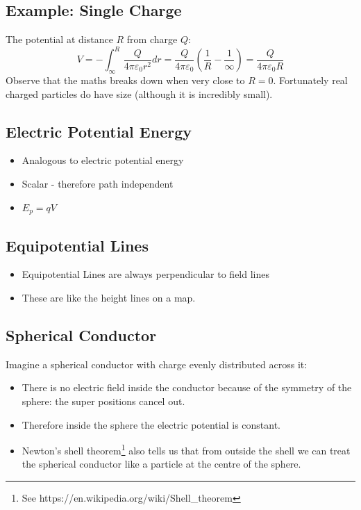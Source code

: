 \documentclass[11pt,a4paper]{report}
\begin{document}
\subsection{Example: Single Charge}
The potential at distance $R$ from charge $Q$:
\begin{equation*}
	V = -\int_{\infty}^R\frac{Q}{4\pi\varepsilon_0r^2}dr = \frac{Q}{4\pi\varepsilon_0}\left(\frac{1}{R} - \frac{1}{\infty}\right) = \frac{Q}{4\pi\varepsilon_0R}
\end{equation*}
Observe that the maths breaks down when very close to $R=0$. Fortunately real charged particles do have size (although it is incredibly small).

\subsection{Electric Potential Energy}
\begin{itemize}
	\item Analogous to electric potential energy
	\item Scalar - therefore path independent
	\item $E_p = qV$
\end{itemize}

\subsection{Equipotential Lines}
\begin{itemize}
	\item Equipotential Lines are always perpendicular to field lines
	\item These are like the height lines on a map.
\end{itemize}

\subsection{Spherical Conductor}
Imagine a spherical conductor with charge evenly distributed across it:
\begin{itemize}
	\item There is no electric field inside the conductor because of the symmetry of the sphere: the super positions cancel out.
	\item Therefore inside the sphere the electric potential is constant.
	\item Newton's shell theorem\footnote{See https://en.wikipedia.org/wiki/Shell\_theorem} also tells us that from outside the shell we can treat the spherical conductor like a particle at the centre of the sphere.
\end{itemize}
\end{document}
